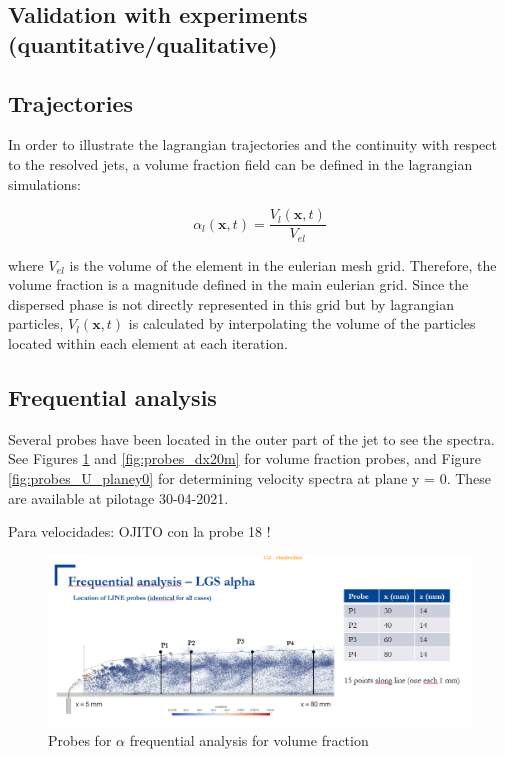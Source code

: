 
\subsection{Validation with experiments (quantitative/qualitative)}

\subsection{Trajectories}

In order to illustrate the lagrangian trajectories and the continuity with respect to the resolved jets, a volume fraction field can be defined in the lagrangian simulations:

\begin{equation}
\alpha_l \left( \textbf{x}, t \right) = \frac{V_l \left( \textbf{x}, t \right)}{V_{el}}
\end{equation}

where $V_{el}$ is the volume of the element in the eulerian mesh grid. Therefore, the volume fraction is a magnitude defined in the main eulerian grid. Since the dispersed phase is not directly represented in this grid but by lagrangian particles, $V_l \left( \textbf{x}, t \right)$ is calculated by interpolating the volume of the particles located within each element at each iteration.

\subsection{Frequential analysis}

Several probes have been located in the outer part of the jet to see the spectra. See Figures \ref{fig:probes_dx10m} and \ref{fig:probes_dx20m} for volume fraction probes, and Figure \ref{fig:probes_U_planey0} for determining velocity spectra at plane y = 0. These are available at pilotage 30-04-2021.

Para velocidades: OJITO con la probe 18 !

\begin{figure}[h!]
	\centering
	\includegraphics[scale=0.7]{./part2_developments/figures_ch6_lagrangian_JICF/probes_vol_frac}
	\caption{Probes for $\alpha$ frequential analysis for volume fraction}
	\label{fig:probes_dx10m}
\end{figure}


